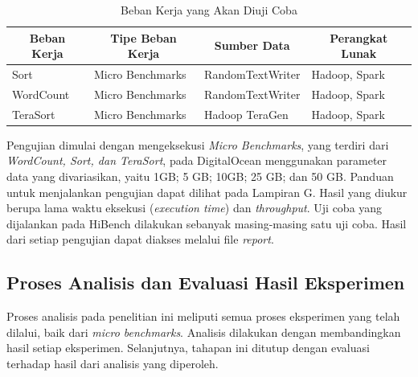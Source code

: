 \begin{table}[h!]
\centering
\caption{Beban Kerja yang Akan Diuji Coba}
\begin{tabular}{|l|l|l|l|}
\hline
\multicolumn{1}{|c|}{\textbf{Beban Kerja}} & \multicolumn{1}{c|}{\textbf{Tipe Beban Kerja}} & \multicolumn{1}{c|}{\textbf{Sumber Data}} & \multicolumn{1}{c|}{\textbf{Perangkat Lunak}} \\ \hline
Sort & Micro Benchmarks & RandomTextWriter & Hadoop, Spark \\ \hline
WordCount & Micro Benchmarks & RandomTextWriter & Hadoop, Spark \\ \hline
TeraSort & Micro Benchmarks & Hadoop TeraGen & Hadoop, Spark \\ \hline
\end{tabular}
\label{table:workload}
\end{table}

Pengujian dimulai dengan mengeksekusi \textit{Micro Benchmarks}, yang terdiri dari \textit{WordCount, Sort, dan TeraSort}, pada DigitalOcean menggunakan parameter data yang divariasikan, yaitu {1GB; 5 GB; 10GB; 25 GB; dan 50 GB}. Panduan untuk menjalankan pengujian dapat dilihat pada Lampiran G. Hasil yang diukur berupa lama waktu eksekusi (\textit{execution time}) dan \textit{throughput}. Uji coba yang dijalankan pada HiBench dilakukan sebanyak masing-masing satu uji coba. Hasil dari setiap pengujian dapat diakses melalui file \textit{report}.

\subsection{Proses Analisis dan Evaluasi Hasil Eksperimen}
Proses analisis pada penelitian ini meliputi semua proses eksperimen yang telah dilalui, baik dari \textit{micro benchmarks}. Analisis dilakukan dengan membandingkan hasil setiap eksperimen. Selanjutnya, tahapan ini ditutup dengan evaluasi terhadap hasil dari analisis yang diperoleh.








